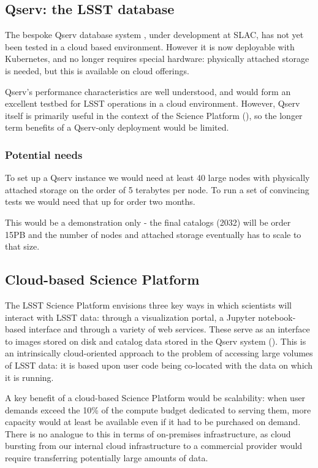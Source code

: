 \subsection{Qserv: the LSST database}\label{sect:qserv}

The bespoke Qserv database system , under development at SLAC, has not yet been tested in a cloud based environment.
However it is now deployable with Kubernetes, and no longer requires special hardware: physically attached storage is needed, but this is available on cloud offerings.

Qserv's performance characteristics are well understood, and would form an excellent testbed for LSST operations in a cloud environment.
However, Qserv itself is primarily useful in the context of the Science Platform (), so the longer term benefits of a Qserv-only deployment would be limited.

\subsubsection{Potential needs} \label{sect:qservneeds}

To set up a Qserv instance we would need at least 40 large nodes with physically attached storage on the order of 5 terabytes per node.
To run a set of convincing tests we would need that up for order two months.

This would be a  demonstration only - the final catalogs (2032) will be order 15PB and the number of nodes and attached storage eventually has to scale to that size.

\subsection{Cloud-based Science Platform} \label{sect:platform}

The LSST Science Platform  envisions three key ways in which scientists will interact with LSST data: through a visualization portal, a Jupyter notebook-based interface and through a variety of web services.
These serve as an interface to images stored on disk and catalog data stored in the Qserv system ().
This is an intrinsically cloud-oriented approach to the problem of accessing large volumes of LSST data: it is based upon user code being co-located with the data on which it is running.

A key benefit of a cloud-based Science Platform would be scalability: when user demands exceed the 10\% of the compute budget dedicated to serving them, more capacity would at least be available even if it had to be purchased on demand.
There is no analogue to this in terms of on-premises infrastructure, as cloud bursting from our internal cloud infrastructure to a commercial provider would require transferring potentially large amounts of data.

